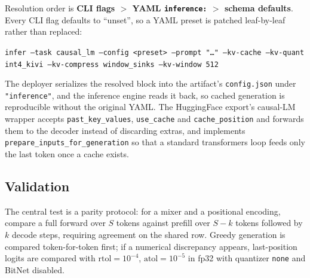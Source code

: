 Resolution order is \textbf{CLI flags $>$ YAML \texttt{inference:} $>$ schema defaults}. Every CLI flag defaults to ``unset'', so a YAML preset is patched leaf-by-leaf rather than replaced:
\begin{center}
\footnotesize
\texttt{infer --task causal\_lm --config\,<preset> --prompt "\ldots" --kv-cache --kv-quant int4\_kivi --kv-compress window\_sinks --kv-window 512}
\end{center}
The deployer serializes the resolved block into the artifact's \texttt{config.json} under \texttt{"inference"}, and the inference engine reads it back, so cached generation is reproducible without the original YAML. The HuggingFace export's causal-LM wrapper accepts \texttt{past\_key\_values}, \texttt{use\_cache} and \texttt{cache\_position} and forwards them to the decoder instead of discarding extras, and implements \texttt{prepare\_inputs\_for\_generation} so that a standard transformers loop feeds only the last token once a cache exists.

\subsection{Validation}
\label{sec:kv-validation}

The central test is a parity protocol: for a mixer and a positional encoding, compare a full forward over $S$ tokens against prefill over $S-k$ tokens followed by $k$ decode steps, requiring agreement on the shared row. Greedy generation is compared token-for-token first; if a numerical discrepancy appears, last-position logits are compared with $\mathrm{rtol}=10^{-4}$, $\mathrm{atol}=10^{-5}$ in fp32 with quantizer \texttt{none} and BitNet disabled.

